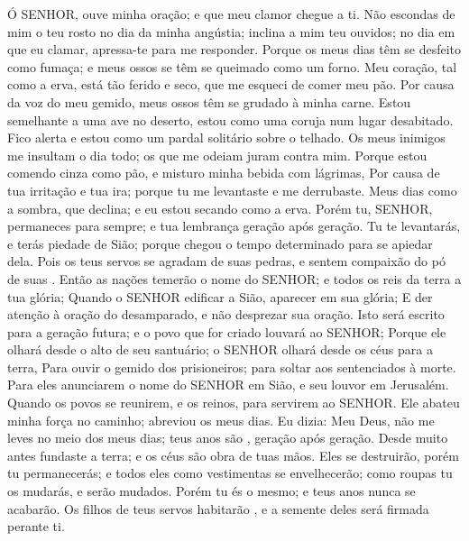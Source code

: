 
{\PP 
  Ó SENHOR, ouve minha oração; e que meu clamor chegue a ti.
  Não escondas de mim o teu rosto no dia da minha angústia; inclina a mim teu ouvidos; no dia em que eu clamar, apressa-te para me responder.
  Porque os meus dias têm se desfeito como fumaça; e meus ossos se têm se queimado como
{} um forno.
  Meu coração, tal como a erva, está tão ferido e seco, que me esqueci de comer meu pão.
  Por causa da voz do meu gemido, meus ossos têm se grudado à minha carne.
  Estou semelhante a uma ave no deserto, estou como uma coruja num lugar desabitado.
  Fico alerta e estou como um pardal solitário sobre o telhado.
  Os meus inimigos me insultam o dia todo; os que me odeiam juram
{} contra mim.
  Porque estou comendo cinza como
{} pão, e misturo minha bebida com lágrimas,
  Por causa de tua irritação e tua ira; porque tu me levantaste e me derrubaste.
  Meus dias
{} como a sombra, que declina; e eu estou secando como a erva.
  Porém tu, SENHOR, permaneces para sempre; e tua lembrança
{} geração após geração.
  Tu te levantarás, e terás piedade de Sião; porque chegou o tempo determinado para se apiedar dela.
  Pois os teus servos se agradam de suas pedras, e sentem compaixão do pó de suas
{} .
  Então as nações temerão o nome do SENHOR; e todos os reis da terra
{} a tua glória;
  Quando o SENHOR edificar a Sião,
{} aparecer em sua glória;
  E der atenção à oração do desamparado, e não desprezar sua oração.
  Isto será escrito para a geração futura; e o povo que for criado louvará ao SENHOR;
  Porque ele olhará desde o alto de seu santuário; o SENHOR olhará desde os céus para a terra,
  Para ouvir o gemido dos prisioneiros; para soltar aos sentenciados à morte.
  Para eles anunciarem o nome do SENHOR em Sião, e seu louvor em Jerusalém.
  Quando os povos se reunirem, e os reinos, para servirem ao SENHOR.
  Ele abateu minha força no caminho; abreviou os meus dias.
  Eu dizia: Meu Deus, não me leves no meio dos meus dias; teus anos são
{}, geração após geração.
  Desde muito antes fundaste a terra; e os céus são obra de tuas mãos.
  Eles se destruirão, porém tu permanecerás; e todos eles como vestimentas se envelhecerão; como roupas tu os mudarás, e serão mudados.
  Porém tu és o mesmo; e teus anos nunca se acabarão.
  Os filhos de teus servos habitarão
{}, e a semente deles será firmada perante ti.
\par }

